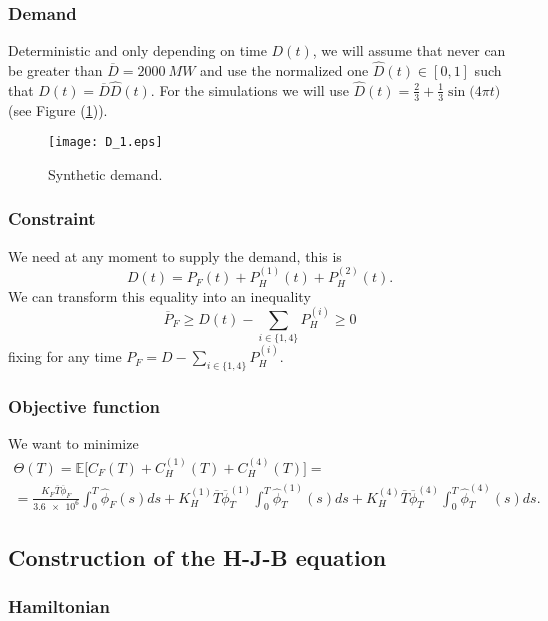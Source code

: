 \documentclass[12pt]{article}
\theoremstyle{definition}
\theoremstyle{remark}
\newcommand{\E}{\mathbb{E}}
\begin{document}
\subsubsection{Demand}

Deterministic and only depending on time $D(t)$, we will assume that never can be greater than $\overline{D}=\SI{2000}{MW}$ and use the normalized one $\hat{D}(t)\in[0,1]$ such that $D(t)=\overline{D}\hat{D}(t)$. For the simulations we will use $\hat{D}(t)=\frac{2}{3}+\frac{1}{3}\sin\big(4\pi t\big)$ (see Figure (\ref{D_1ex})).
\begin{figure}[ht!]
\centering
\texttt{[image: D\_1.eps]}
\caption{Synthetic demand.}
\label{D_1ex}
\end{figure}

\subsubsection{Constraint}

We need at any moment to supply the demand, this is
\begin{equation}
D(t)=P_F(t)+P_H^{(1)}(t)+P_H^{(2)}(t).
\label{Eq_Con}
\end{equation}
We can transform this equality into an inequality
\begin{equation*}
\overline{P}_F\geq D(t)-\sum_{i\in\{1,4\}}P_H^{(i)}\geq0
\end{equation*}
fixing for any time $P_F=D-\sum_{i\in\{1,4\}}P_H^{(i)}$.

\subsubsection{Objective function}

We want to minimize
\begin{multline*}
\Theta(T)=\E\Big[C_F(T)+C_H^{(1)}(T)+C_H^{(4)}(T)\Big]=\\
=\frac{K_F\overline{T}\overline{\phi}_F}{\num{3.6e6}}\int_0^T\hat{\phi}_F(s)ds+K_H^{(1)}\overline{T}\overline{\phi}_T^{(1)}\int_0^T\hat{\phi}_T^{(1)}(s)ds+K_H^{(4)}\overline{T}\overline{\phi}_T^{(4)}\int_0^T\hat{\phi}_T^{(4)}(s)ds.
\end{multline*}

\subsection{Construction of the H-J-B equation}

\subsubsection{Hamiltonian}
\end{document}
